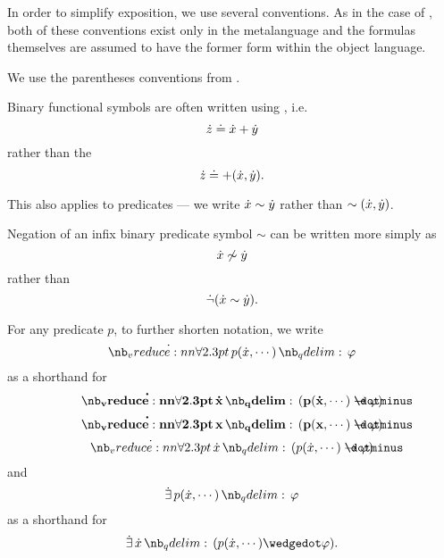 \begin{remark}\label{rem:first_order_formula_conventions}
  In order to simplify exposition, we use several conventions. As in the case of , both of these conventions exist only in the metalanguage and the formulas themselves are assumed to have the former form within the object language.
  \begin{thmenum}
     We use the parentheses conventions from .

     Binary functional symbols are often written using , i.e.
    \begin{equation*}
      {\dot{z}} \doteq {\dot{x}} + {\dot{y}}
    \end{equation*}
    rather than the 
    \begin{equation*}
      {\dot{z}} \doteq +({\dot{x}}, {\dot{y}}).
    \end{equation*}

    This also applies to predicates --- we write \( {\dot{x}} \sim {\dot{y}} \) rather than \( \sim({\dot{x}}, {\dot{y}}) \).

     Negation of an infix binary predicate symbol \( \sim \) can be written more simply as
    \begin{equation*}
      {\dot{x}} \not\sim {\dot{y}}
    \end{equation*}
    rather than
    \begin{equation*}
      \dot\neg({\dot{x}} \sim {\dot{y}}).
    \end{equation*}

     For any predicate \( p \), to further shorten notation, we write
    \begin{equation*}
      \qforall {p(\synx, \cdots)} \varphi
    \end{equation*}
    as a shorthand for
    \begin{equation*}
      \mathbf{\qforall \synx (p(\synx, \cdots) \synimplies \varphi)}
    \end{equation*}
    \begin{equation*}
      \mathbf{\qforall x (p(x, \cdots) \synimplies \varphi)}
    \end{equation*}
    \begin{equation*}
      \qforall \synx (p(\synx, \cdots) \synimplies \varphi)
    \end{equation*}
    and
    \begin{equation*}
      \qexists {p(\synx, \cdots)} \varphi
    \end{equation*}
    as a shorthand for
    \begin{equation*}
      \qexists \synx (p(\synx, \cdots) \synwedge \varphi).
    \end{equation*}


\end{thmenum}
\end{remark}
